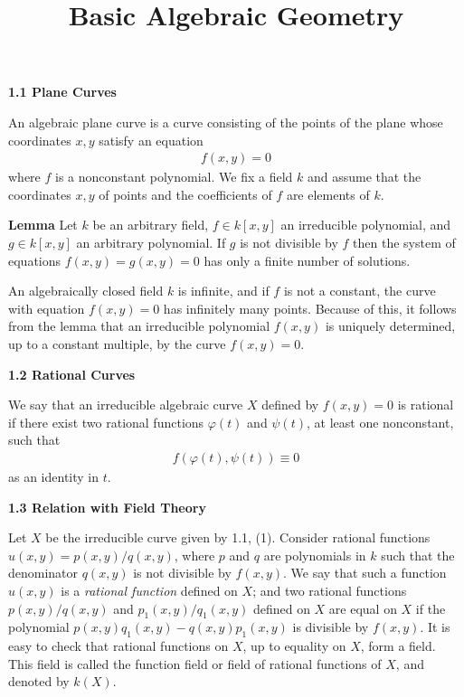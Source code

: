 \documentclass[hidelinks, 12pt]{article}
\title{Basic Algebraic Geometry}
\date{}
\theoremstyle{mydefstyle}
\theoremstyle{mythmstyle}
\begin{document}
\pagecolor{white}

\textbf{1.1 Plane Curves}

An algebraic plane curve is a curve consisting of the points of the plane whose coordinates $x, y$ satisfy an equation
\begin{gather*}
f(x, y) = 0 \tag{1}
\end{gather*}
where $f$ is a nonconstant polynomial. We fix a field $k$ and assume that the coordinates $x, y$ of points and the coefficients of $f$ are elements of $k$. 

\textbf{Lemma} Let $k$ be an arbitrary field, $f \in k[x, y]$ an irreducible polynomial, and $g \in k[x, y]$ an arbitrary polynomial. If $g$ is not divisible by $f$ then the system of equations $f(x, y) = g(x, y) = 0$ has only a finite number of solutions.

An algebraically closed field $k$ is infinite, and if $f$ is not a constant, the curve with equation $f(x, y) = 0$ has infinitely many points. Because of this, it follows from the lemma that an irreducible polynomial $f(x, y)$ is uniquely determined, up to a constant multiple, by the curve $f(x, y) = 0$. 

\textbf{1.2 Rational Curves}

We say that an irreducible algebraic curve $X$ defined by $f(x, y) = 0$ is rational if there exist two rational functions $\varphi(t)$ and $\psi(t)$, at least one nonconstant, such that
\begin{gather*}
f(\varphi(t), \psi(t)) \equiv 0 \tag{3}
\end{gather*}
as an identity in $t$. 

\textbf{1.3 Relation with Field Theory}

Let $X$ be the irreducible curve given by 1.1, (1). Consider rational functions $u(x, y) = p(x, y)/q(x, y)$, where $p$ and $q$ are polynomials in $k$ such that the denominator $q(x, y)$ is not divisible by $f(x, y)$. We say that such a function $u(x, y)$ is a \emph{rational function} defined on $X$; and two rational functions $p(x, y)/q(x, y)$ and $p_1(x, y)/q_1(x, y)$ defined on $X$ are equal on $X$ if the polynomial $p(x, y)q_1(x, y) - q(x, y)p_1(x, y)$ is divisible by $f(x, y)$. It is easy to check that rational functions on $X$, up to equality on $X$, form a field. This field is called the function field or field of rational functions of $X$, and denoted by $k(X)$.
\end{document}
